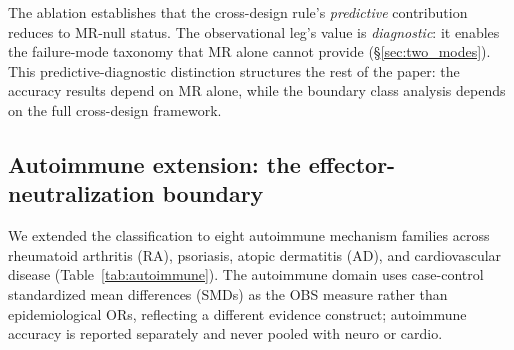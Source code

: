 \documentclass[11pt]{article}
\begin{document}
The ablation establishes that the cross-design rule's \emph{predictive} contribution reduces to MR-null status. The observational leg's value is \emph{diagnostic}: it enables the failure-mode taxonomy that MR alone cannot provide (\S\ref{sec:two_modes}). This predictive-diagnostic distinction structures the rest of the paper: the accuracy results depend on MR alone, while the boundary class analysis depends on the full cross-design framework.

\subsection{Autoimmune extension: the effector-neutralization boundary}
\label{sec:autoimmune}

We extended the classification to eight autoimmune mechanism families across rheumatoid arthritis (RA), psoriasis, atopic dermatitis (AD), and cardiovascular disease (Table~\ref{tab:autoimmune}). The autoimmune domain uses case-control standardized mean differences (SMDs) as the OBS measure rather than epidemiological ORs, reflecting a different evidence construct; autoimmune accuracy is reported separately and never pooled with neuro or cardio.
\end{document}
